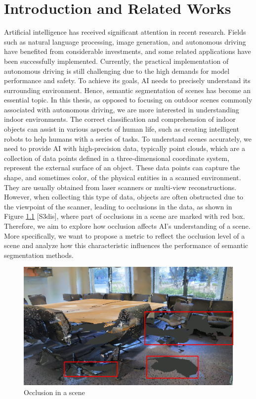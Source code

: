 \documentclass[11pt, a4paper,oneside,chapterprefix=false]{scrbook}
\begin{document}
\chapter{Introduction and Related Works} \label{chp:introduction}


Artificial intelligence has received significant attention in recent research. Fields such as natural language processing, image generation, and autonomous driving have benefited from considerable investments, and some related applications have been successfully implemented. Currently, the practical implementation of autonomous driving is still challenging due to the high demands for model performance and safety. To achieve its goals, AI needs to precisely understand its surrounding environment. Hence, semantic segmentation of scenes has become an essential topic. In this thesis, as opposed to focusing on outdoor scenes commonly associated with autonomous driving, we are more interested in understanding indoor environments. The correct classification and comprehension of indoor objects can assist in various aspects of human life, such as creating intelligent robots to help humans with a series of tasks. To understand scenes accurately, we need to provide AI with high-precision data, typically point clouds, which are a collection of data points defined in a three-dimensional coordinate system, represent the external surface of an object. These data points can capture the shape, and sometimes color, of the physical entities in a scanned environment. They are usually obtained from laser scanners or multi-view reconstructions. However, when collecting this type of data, objects are often obstructed due to the viewpoint of the scanner, leading to occlusions in the data, as shown in Figure \ref{fig:occlusion in a scene} [S3dis], where part of occlusions in a scene are marked with red box. Therefore, we aim to explore how occlusion affects AI's understanding of a scene. More specifically, we want to propose a metric to reflect the occlusion level of a scene and analyze how this characteristic influences the performance of semantic segmentation methods.


\begin{figure}[h]
    \centering
    \includegraphics*[width=1.0\textwidth]{figures/occlusion in conf2.png}
    \caption{Occlusion in a scene}
    \label{fig:occlusion in a scene}
\end{figure}
\end{document}

